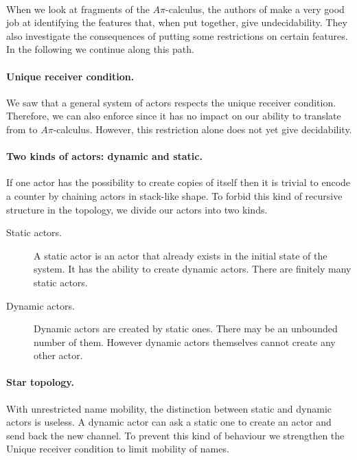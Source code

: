 \documentclass[a4paper]{report}
\numberwithin{algorithm}{chapter}
\begin{document}
\paragraph{}
When we look at fragments of the $A\pi$-calculus, the authors of \cite{DBLP:journals/njc/AmadioM02} make a very good job at identifying the features that, when put together, give undecidability.
They also investigate the consequences of putting some restrictions on certain features.
In the following we continue along this path.

\paragraph{Unique receiver condition.}
We saw that a general system of actors respects the unique receiver condition.
Therefore, we can also enforce since it has no impact on our ability to translate from \scala{} to $A\pi$-calculus.
However, this restriction alone does not yet give decidability.

\paragraph{Two kinds of actors: dynamic and static.}
If one actor has the possibility to create copies of itself then it is trivial to encode a counter by chaining actors in stack-like shape.
To forbid this kind of recursive structure in the topology, we divide our actors into two kinds.
\begin{description}
\item[Static actors.]
A static actor is an actor that already exists in the initial state of the system.
It has the ability to create dynamic actors.
There are finitely many static actors.
\item[Dynamic actors.]
Dynamic actors are created by static ones.
There may be an unbounded number of them.
However dynamic actors themselves cannot create any other actor.
\end{description}

\paragraph{Star topology.}
With unrestricted name mobility, the distinction between static and dynamic actors is useless.
A dynamic actor can ask a static one to create an actor and send back the new channel.
To prevent this kind of behaviour we strengthen the Unique receiver condition to limit mobility of names.
\end{document}
